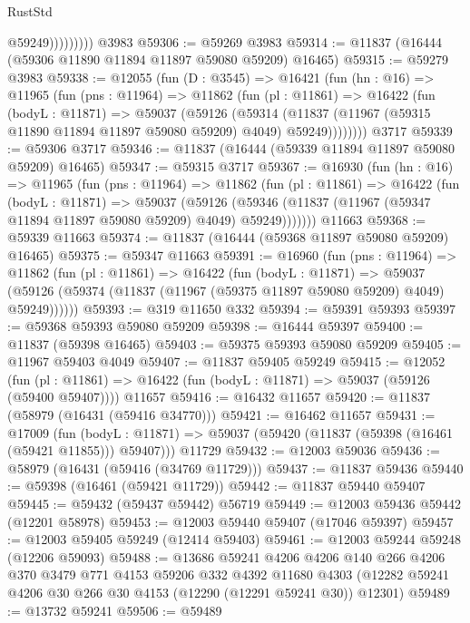 \begin{lexlean}{RustStd}
\begin{coremodule}
                      @59249)))))))))
    @3983
@59306 := @59269 @3983
@59314 := @11837 (@16444 (@59306 @11890 @11894 @11897 @59080 @59209) @16465)
@59315 := @59279 @3983
@59338 := @12055
    (fun (D : @3545) =>
    @16421
      (fun (hn : @16) =>
      @11965
        (fun (pns : @11964) =>
        @11862
          (fun (pl : @11861) =>
          @16422
            (fun (bodyL : @11871) =>
            @59037
              (@59126
                (@59314
                  (@11837 (@11967 (@59315 @11890 @11894 @11897 @59080 @59209) @4049) @59249))))))))
    @3717
@59339 := @59306 @3717
@59346 := @11837 (@16444 (@59339 @11894 @11897 @59080 @59209) @16465)
@59347 := @59315 @3717
@59367 := @16930
    (fun (hn : @16) =>
    @11965
      (fun (pns : @11964) =>
      @11862
        (fun (pl : @11861) =>
        @16422
          (fun (bodyL : @11871) =>
          @59037
            (@59126
              (@59346 (@11837 (@11967 (@59347 @11894 @11897 @59080 @59209) @4049) @59249)))))))
    @11663
@59368 := @59339 @11663
@59374 := @11837 (@16444 (@59368 @11897 @59080 @59209) @16465)
@59375 := @59347 @11663
@59391 := @16960
    (fun (pns : @11964) =>
    @11862
      (fun (pl : @11861) =>
      @16422
        (fun (bodyL : @11871) =>
        @59037 (@59126 (@59374 (@11837 (@11967 (@59375 @11897 @59080 @59209) @4049) @59249))))))
@59393 := @319 @11650 @332
@59394 := @59391 @59393
@59397 := @59368 @59393 @59080 @59209
@59398 := @16444 @59397
@59400 := @11837 (@59398 @16465)
@59403 := @59375 @59393 @59080 @59209
@59405 := @11967 @59403 @4049
@59407 := @11837 @59405 @59249
@59415 := @12052
    (fun (pl : @11861) => @16422 (fun (bodyL : @11871) => @59037 (@59126 (@59400 @59407))))
    @11657
@59416 := @16432 @11657
@59420 := @11837 (@58979 (@16431 (@59416 @34770)))
@59421 := @16462 @11657
@59431 := @17009
    (fun (bodyL : @11871) => @59037 (@59420 (@11837 (@59398 (@16461 (@59421 @11855))) @59407)))
    @11729
@59432 := @12003 @59036
@59436 := @58979 (@16431 (@59416 (@34769 @11729)))
@59437 := @11837 @59436
@59440 := @59398 (@16461 (@59421 @11729))
@59442 := @11837 @59440 @59407
@59445 := @59432 (@59437 @59442) @56719
@59449 := @12003 @59436 @59442 (@12201 @58978)
@59453 := @12003 @59440 @59407 (@17046 @59397)
@59457 := @12003 @59405 @59249 (@12414 @59403)
@59461 := @12003 @59244 @59248 (@12206 @59093)
@59488 := @13686
    @59241
    @4206
    @4206
    @140
    @266
    @4206
    @370
    @3479
    @771
    @4153
    @59206
    @332
    @4392
    @11680
    @4303
    (@12282 @59241 @4206 @30 @266 @30 @4153 (@12290 (@12291 @59241 @30)) @12301)
@59489 := @13732 @59241
@59506 := @59489

\end{coremodule}
\end{lexlean}
